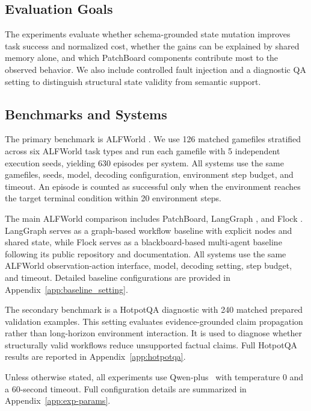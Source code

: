 \documentclass[11pt]{article}
\newcommand{\method}{PatchBoard}
\begin{document}
\subsection{Evaluation Goals}

The experiments evaluate whether schema-grounded state mutation improves task success and normalized cost, whether the gains can be explained by shared memory alone, and which \method{} components contribute most to the observed behavior. We also include controlled fault injection and a diagnostic QA setting to distinguish structural state validity from semantic support.

\subsection{Benchmarks and Systems}

The primary benchmark is ALFWorld \citep{shridhar2021alfworld}. We use 126 matched gamefiles stratified across six ALFWorld task types and run each gamefile with 5 independent execution seeds, yielding 630 episodes per system. All systems use the same gamefiles, seeds, model, decoding configuration, environment step budget, and timeout. An episode is counted as successful only when the environment reaches the target terminal condition within 20 environment steps.

The main ALFWorld comparison includes \method{}, LangGraph \citep{langgraph2024}, and Flock \citep{flockdocs2025}. LangGraph serves as a graph-based workflow baseline with explicit nodes and shared state, while Flock serves as a blackboard-based multi-agent baseline following its public repository and documentation. All systems use the same ALFWorld observation-action interface, model, decoding setting, step budget, and timeout. Detailed baseline configurations are provided in Appendix~\ref{app:baseline_setting}.


The secondary benchmark is a HotpotQA diagnostic \citep{yang2018hotpotqa} with 240 matched prepared validation examples. This setting evaluates evidence-grounded claim propagation rather than long-horizon environment interaction. It is used to diagnose whether structurally valid workflows reduce unsupported factual claims. Full HotpotQA results are reported in Appendix~\ref{app:hotpotqa}.

Unless otherwise stated, all experiments use Qwen-plus~\citep{yang2025qwen3technicalreport} with temperature 0 and a 60-second timeout. Full configuration details are summarized in Appendix~\ref{app:exp-params}.
\end{document}
